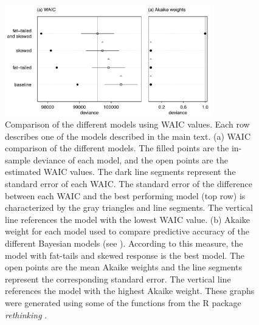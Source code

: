 \documentclass[11pt, a4paper]{article}
\begin{document}
\begin{figure}[h]
  \centering
    \vspace{0.5cm}
    \includegraphics[width=0.8\textwidth]{figures/WAIC-plot}
    	  \vspace{0.3cm}
	   \caption{Comparison of the different models using WAIC values. Each row describes one of the models described in the main text. (a) WAIC comparison of the different models. The filled points are the in-sample deviance of each model, and the open points are the estimated WAIC values. The dark line segments represent the standard error of each WAIC. The standard error of the difference between each WAIC and the best performing model (top row) is characterized by the gray triangles and line segments. The vertical line references the model with the lowest WAIC value. (b) Akaike weight for each model used to compare predictive accuracy of the different Bayesian models (see \citealt{mcelreathStatisticalRethinkingBayesian2020}). According to this measure, the model with fat-tails and skewed response is the best model. The open points are the mean Akaike weights and the line segments represent the corresponding standard error. The vertical line references the model with the highest Akaike weight. These graphs were generated using some of the functions from the R package \textit{rethinking} \citep{mcelreathStatisticalRethinkingBayesian2020}.}
      \label{sfig:WAIC}
\end{figure}

\clearpage
\end{document}
